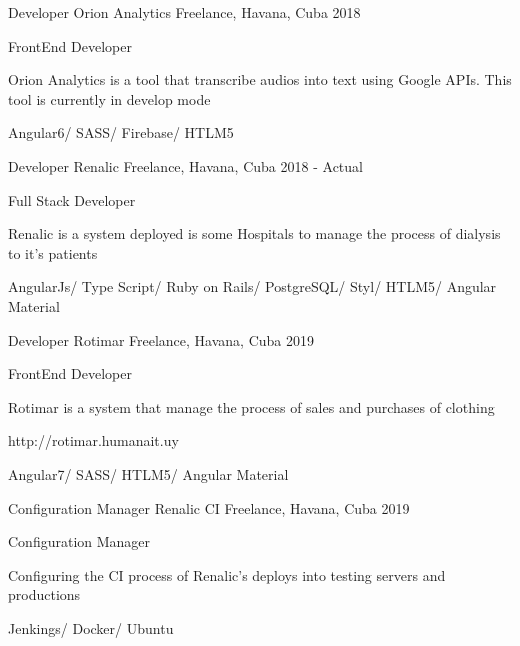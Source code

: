 \begin{cventries}
\cventry
{Developer} %
{Orion Analytics} %
{Freelance, Havana, Cuba} %
{2018} %
{ %
\begin{cvitems}
\item {FrontEnd Developer}
\item {Orion Analytics is a tool that transcribe audios into text using Google APIs. This tool is currently in develop mode}
\item {Angular6/ SASS/ Firebase/ HTLM5}
\end{cvitems}
}


\cventry
{Developer} %
{Renalic} %
{Freelance, Havana, Cuba} %
{2018 - Actual} %
{ %
\begin{cvitems}
\item {Full Stack Developer}
\item {Renalic is a system deployed is some Hospitals to manage the process of dialysis to it's patients}
\item {AngularJs/ Type Script/ Ruby on Rails/ PostgreSQL/ Styl/ HTLM5/ Angular Material}
\end{cvitems}
}


\cventry
{Developer} %
{Rotimar} %
{Freelance, Havana, Cuba} %
{2019} %
{ %
\begin{cvitems}
\item {FrontEnd Developer}
\item {Rotimar is a system that manage the process of sales and purchases of clothing }
\item {http://rotimar.humanait.uy}
\item {Angular7/ SASS/ HTLM5/ Angular Material}
\end{cvitems}
}



\cventry
{Configuration Manager} %
{Renalic CI} %
{Freelance, Havana, Cuba} %
{2019} %
{ %
\begin{cvitems}
\item {Configuration Manager}
\item {Configuring the CI process of Renalic's deploys into testing servers and productions}
\item {Jenkings/ Docker/ Ubuntu}
\end{cvitems}
}


\end{cventries}

